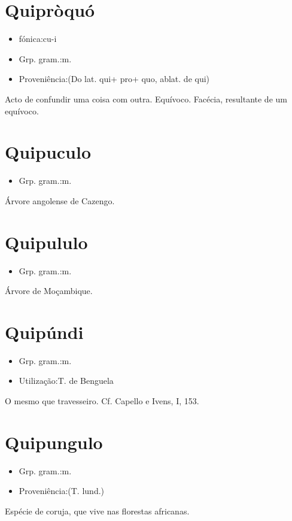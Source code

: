 \section{Quipròquó}
\begin{itemize}
\item {fónica:cu-i}
\end{itemize}
\begin{itemize}
\item {Grp. gram.:m.}
\end{itemize}
\begin{itemize}
\item {Proveniência:(Do lat. \textunderscore qui\textunderscore  + \textunderscore pro\textunderscore  + \textunderscore quo\textunderscore , ablat. de \textunderscore qui\textunderscore )}
\end{itemize}
Acto de confundir uma coisa com outra.
Equívoco.
Facécia, resultante de um equívoco.
\section{Quipuculo}
\begin{itemize}
\item {Grp. gram.:m.}
\end{itemize}
Árvore angolense de Cazengo.
\section{Quipululo}
\begin{itemize}
\item {Grp. gram.:m.}
\end{itemize}
Árvore de Moçambique.
\section{Quipúndi}
\begin{itemize}
\item {Grp. gram.:m.}
\end{itemize}
\begin{itemize}
\item {Utilização:T. de Benguela}
\end{itemize}
O mesmo que \textunderscore travesseiro\textunderscore . Cf. Capello e Ivens, I, 153.
\section{Quipungulo}
\begin{itemize}
\item {Grp. gram.:m.}
\end{itemize}
\begin{itemize}
\item {Proveniência:(T. lund.)}
\end{itemize}
Espécie de coruja, que vive nas florestas africanas.
